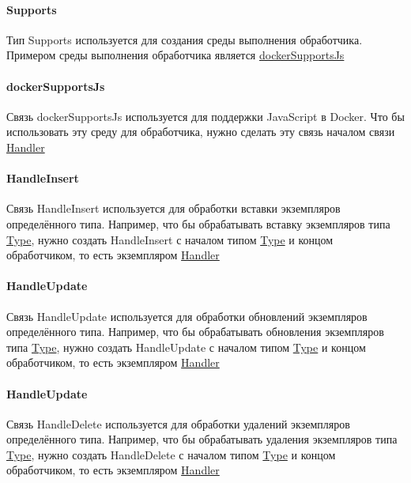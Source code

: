 \documentclass{article}
\begin{document}
\paragraph*{Supports}\hypertarget{Core.Supports.Description}{}
Тип Supports используется для создания среды
выполнения обработчика. Примером среды выполнения обработчика является
\hyperlink{Core.dockerSupportsJs.Description}{dockerSupportsJs}
\paragraph*{dockerSupportsJs}\hypertarget{Core.dockerSupportsJs.Description}{}
Связь dockerSupportsJs используется для
поддержки JavaScript в Docker. Что бы использовать эту среду для обработчика,
нужно сделать эту связь началом связи
\hyperlink{Core.Handler.Description}{Handler}
\paragraph*{HandleInsert}\hypertarget{Core.HandleInsert.Description}{}
Связь HandleInsert используется для обработки
вставки экземпляров определённого типа. Например, что бы обрабатывать вставку
экземпляров типа \hyperlink{Core.Type.Description}{Type}, нужно создать
HandleInsert с
началом типом \hyperlink{Core.Type.Description}{Type} и концом обработчиком, то
есть
экземпляром \hyperlink{Core.Handler.Description}{Handler}
\paragraph*{HandleUpdate}\hypertarget{Core.HandleUpdate.Description}{}
Связь HandleUpdate используется для обработки
обновлений экземпляров определённого типа. Например, что бы обрабатывать
обновления экземпляров типа \hyperlink{Core.Type.Description}{Type}, нужно
создать
HandleUpdate с началом типом \hyperlink{Core.Type.Description}{Type} и концом
обработчиком,
то есть экземпляром \hyperlink{Core.Handler.Description}{Handler}
\paragraph*{HandleUpdate}\hypertarget{Core.HandleDelete.Description}{}
Связь HandleDelete используется для обработки
удалений экземпляров определённого типа. Например, что бы обрабатывать удаления
экземпляров типа \hyperlink{Core.Type.Description}{Type}, нужно создать
HandleDelete с
началом типом \hyperlink{Core.Type.Description}{Type} и концом обработчиком, то
есть
экземпляром \hyperlink{Core.Handler.Description}{Handler}
\end{document}
